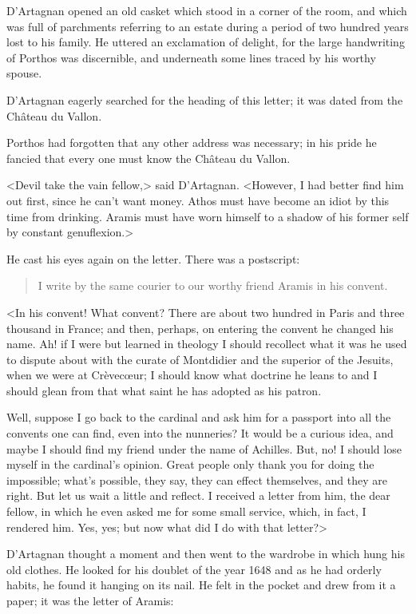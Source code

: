 D'Artagnan opened an old casket which stood in a corner of the room, and which was full of parchments referring to an estate during a period of two hundred years lost to his family. He uttered an exclamation of delight, for the large handwriting of Porthos was discernible, and underneath some lines traced by his worthy spouse.

D'Artagnan eagerly searched for the heading of this letter; it was dated from the Château du Vallon.

Porthos had forgotten that any other address was necessary; in his pride he fancied that every one must know the Château du Vallon.

<Devil take the vain fellow,> said D'Artagnan. <However, I had better find him out first, since he can't want money. Athos must have become an idiot by this time from drinking. Aramis must have worn himself to a shadow of his former self by constant genuflexion.>

He cast his eyes again on the letter. There was a postscript:  
\begin{quote}
I write by the same courier to our worthy friend Aramis in his convent.
\end{quote}

<In his convent! What convent? There are about two hundred in Paris and three thousand in France; and then, perhaps, on entering the convent he changed his name. Ah! if I were but learned in theology I should recollect what it was he used to dispute about with the curate of Montdidier and the superior of the Jesuits, when we were at Crèvecœur; I should know what doctrine he leans to and I should glean from that what saint he has adopted as his patron.

Well, suppose I go back to the cardinal and ask him for a passport into all the convents one can find, even into the nunneries? It would be a curious idea, and maybe I should find my friend under the name of Achilles. But, no! I should lose myself in the cardinal's opinion. Great people only thank you for doing the impossible; what's possible, they say, they can effect themselves, and they are right. But let us wait a little and reflect. I received a letter from him, the dear fellow, in which he even asked me for some small service, which, in fact, I rendered him. Yes, yes; but now what did I do with that letter?>

D'Artagnan thought a moment and then went to the wardrobe in which hung his old clothes. He looked for his doublet of the year 1648 and as he had orderly habits, he found it hanging on its nail. He felt in the pocket and drew from it a paper; it was the letter of Aramis:  

